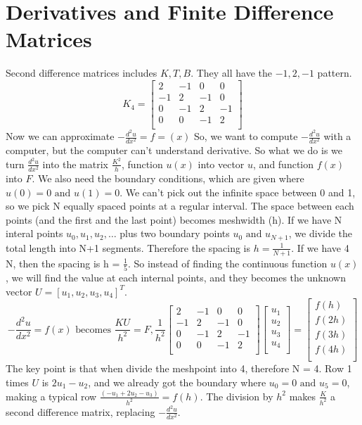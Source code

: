 \section{Derivatives and Finite Difference Matrices}
Second difference matrices includes \(K, T, B\).
They all have the \(-1, 2, -1\) pattern.
\[
    K_4 =
     \begin{bmatrix}
        2 & -1 & 0 & 0  \\
        -1 & 2 & -1 & 0  \\
        0 &  -1 & 2 & -1  \\
        0 & 0 & -1 & 2  \\
    \end{bmatrix}
\]
Now we can approximate \(-\frac{d^2 u}{dx^2} = f=(x)\) 
So, we want to compute \(-\frac{d^2 u}{dx^2}\) with a computer, but the computer can't understand derivative. 
So what we do is we turn \(\frac{d^2 u}{dx^2}\)  into the matrix \(\frac{K^2}{h}\),
function \(u(x)\)  into vector \(u\), and function \(f(x)\) into \(F\).
We also need the boundary conditions, which are given where \(u(0) = 0 \text{ and } u(1)=0\). 
We can't pick out the infinite space between 0 and 1, so we pick N equally spaced points at a regular interval. 
The space between each points (and the first and the last point) becomes meshwidth (h). 
If we have N interal points \(u_0, u_1, u_2, \ldots\) plus two boundary points \(u_0 \text{ and } u_{N+1}\), we divide the total length into N+1 segments.
Therefore the spacing is \(h = \frac{1}{N+1}\).
If we have 4 N, then the spacing is h = \(\frac{1}{5}\).
So instead of finding the continuous function \(u(x)\), we will find the value at each internal points, and they becomes the unknown vector \(U = [u_1, u_2, u_3, u_4]^T\).
\[
-\frac{d^2 u}{dx^2} = f(x)
\text{ becomes }
\frac{KU}{h^2} = F,
\frac{1}{h^2}
    \begin{bmatrix}
        2 & -1 & 0 & 0  \\
        -1 & 2 & -1 & 0  \\
        0 &  -1 & 2 & -1  \\
        0 & 0 & -1 & 2  \\
    \end{bmatrix}
    \begin{bmatrix}
        u_1  \\
        u_2  \\
        u_3  \\
        u_4  \\
    \end{bmatrix}
    =
    \begin{bmatrix}
        f(h)  \\
        f(2h)  \\
        f(3h)  \\
        f(4h)  \\
    \end{bmatrix}
\]
The key point is that when divide the meshpoint into 4, therefore N = 4.
Row 1 times \(U\) is \(2u_1 - u_2\), and we already got the boundary where \(u_0 = 0\text{ and } u_5 = 0\), making a typical row \(\frac{(-u_1 + 2u_2 - u_3)}{h^2} = f(h)\). The division by \(h^2\) makes \(\frac{K}{h^2}\) a second difference matrix, replacing \(-\frac{d^2 u}{dx^2}\).   

